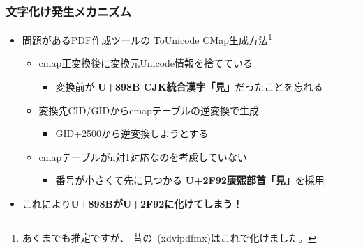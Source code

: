 \begin{frame}\frametitle{文字化け発生メカニズム}
  \begin{itemize}
  \item \footnotesize 問題があるPDF作成ツールの
    ToUnicode CMap生成方法\footnote{\tiny あくまでも推定ですが、
    昔の\XeTeX ~(xdvipdfmx)はこれで化けました。}
    \begin{itemize}
    \item \scriptsize cmap正変換後に変換元Unicode情報を捨てている
      \begin{itemize}
      \item \tiny 変換前が\textbf{\color{blue}
        U+898B CJK統合漢字「見」}だったことを忘れる
      \end{itemize}
    \item \scriptsize 変換先CID/GIDからcmapテーブルの逆変換で生成
      \begin{itemize}
      \item \tiny GID+2500から逆変換しようとする
      \end{itemize}
    \item \scriptsize cmapテーブルがn対1対応なのを考慮していない
      \begin{itemize}
      \item \tiny 番号が小さくて先に見つかる\textbf{\color{red}
        U+2F92康熙部首「見」}を採用
      \end{itemize}
    \end{itemize}
  \item \scriptsize これにより\textbf{U+898BがU+2F92に化けてしまう！}
  \end{itemize}

  \begin{center}\footnotesize
\end{center}
\end{frame}

